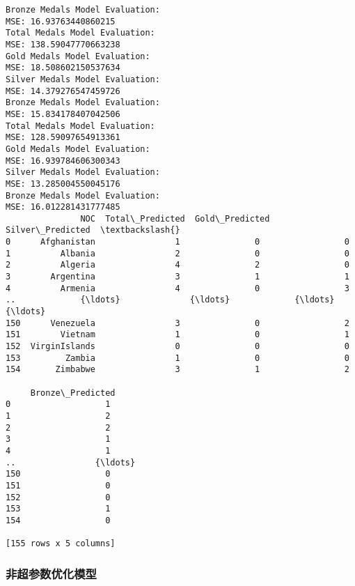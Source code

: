 \documentclass[11pt]{article}
\begin{document}
\begin{Verbatim}[commandchars=\\\{\}]
Bronze Medals Model Evaluation:
MSE: 16.93763440860215
Total Medals Model Evaluation:
MSE: 138.59047770663238
Gold Medals Model Evaluation:
MSE: 18.508602150537634
Silver Medals Model Evaluation:
MSE: 14.379276547459726
Bronze Medals Model Evaluation:
MSE: 15.834178407042506
Total Medals Model Evaluation:
MSE: 128.59097654913361
Gold Medals Model Evaluation:
MSE: 16.939784606300343
Silver Medals Model Evaluation:
MSE: 13.285004550045176
Bronze Medals Model Evaluation:
MSE: 16.012281431777485
               NOC  Total\_Predicted  Gold\_Predicted  Silver\_Predicted  \textbackslash{}
0      Afghanistan                1               0                 0
1          Albania                2               0                 0
2          Algeria                4               2                 0
3        Argentina                3               1                 1
4          Armenia                4               0                 3
..             {\ldots}              {\ldots}             {\ldots}               {\ldots}
150      Venezuela                3               0                 2
151        Vietnam                1               0                 1
152  VirginIslands                0               0                 0
153         Zambia                1               0                 0
154       Zimbabwe                3               1                 2

     Bronze\_Predicted
0                   1
1                   2
2                   2
3                   1
4                   1
..                {\ldots}
150                 0
151                 0
152                 0
153                 1
154                 0

[155 rows x 5 columns]
    \end{Verbatim}

    \subsubsection{非超参数优化模型}\label{ux975eux8d85ux53c2ux6570ux4f18ux5316ux6a21ux578b}
\end{document}
